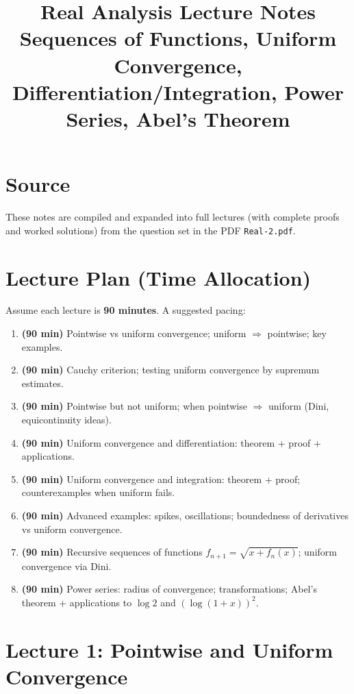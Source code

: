 \documentclass[12pt]{article}
\title{\textbf{Real Analysis Lecture Notes}\\
\large Sequences of Functions, Uniform Convergence, Differentiation/Integration, Power Series, Abel's Theorem}
\author{}
\date{}
\theoremstyle{definition}
\begin{document}
\maketitle
\tableofcontents
\newpage

\section*{Source}
These notes are compiled and expanded into full lectures (with complete proofs and worked solutions) from the question set in the PDF \texttt{Real-2.pdf}. 

\section{Lecture Plan (Time Allocation)}
Assume each lecture is \textbf{90 minutes}. A suggested pacing:

\begin{enumerate}[label=\textbf{L\arabic*.}]
\item \textbf{(90 min)} Pointwise vs uniform convergence; uniform $\Rightarrow$ pointwise; key examples.
\item \textbf{(90 min)} Cauchy criterion; testing uniform convergence by supremum estimates.
\item \textbf{(90 min)} Pointwise but not uniform; when pointwise $\Rightarrow$ uniform (Dini, equicontinuity ideas).
\item \textbf{(90 min)} Uniform convergence and differentiation: theorem + proof + applications.
\item \textbf{(90 min)} Uniform convergence and integration: theorem + proof; counterexamples when uniform fails.
\item \textbf{(90 min)} Advanced examples: spikes, oscillations; boundedness of derivatives vs uniform convergence.
\item \textbf{(90 min)} Recursive sequences of functions $f_{n+1}=\sqrt{x+f_n(x)}$; uniform convergence via Dini.
\item \textbf{(90 min)} Power series: radius of convergence; transformations; Abel's theorem + applications to $\log2$ and $(\log(1+x))^2$.
\end{enumerate}

\newpage

\section{Lecture 1: Pointwise and Uniform Convergence}
\end{document}
